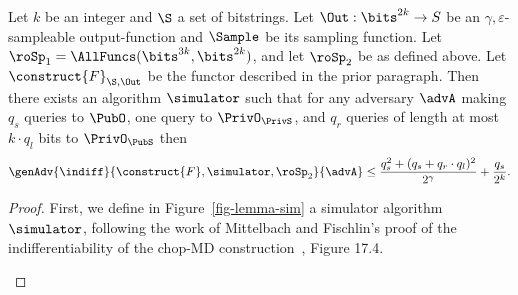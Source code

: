 \begin{theorem}
	\label{th-md-indiff}
	Let $k$ be an integer and $\S$ a set of bitstrings. Let $\Out:\bits^{2k} \to S$ be an $\gamma, \varepsilon$-sampleable output-function and $\Sample$ be its sampling function. Let $\roSp_1 = \AllFuncs(\bits^{3k},\bits^{2k})$, and let $\roSp_2$ be as defined above. Let $\construct{F}_{\S, \Out}$ be the functor described in the prior paragraph. Then there exists an algorithm $\simulator$ such that for any adversary $\advA$ making $q_s$ queries to $\PubO$, one query to $\PrivO_{\PrivS}$, and $q_r$ queries of length at most $k\cdot q_l$ bits to $\PrivO_{\PubS}$ then
	\[\genAdv{\indiff}{\construct{F},\simulator,\roSp_2}{\advA} \leq \frac{q_s^2 + (q_s+q_r \cdot q_l)^2}{2^{\gamma}} + \frac{q_s}{2^k}.\]
\end{theorem}
\begin{proof}
	First, we define in Figure~\ref{fig-lemma-sim} a simulator algorithm $\simulator$, following the work of Mittelbach and Fischlin's proof of the indifferentiability of the chop-MD construction~\cite{hfrobook}, Figure 17.4. 
	
	\begin{figure}
		
\end{figure}
\end{proof}
